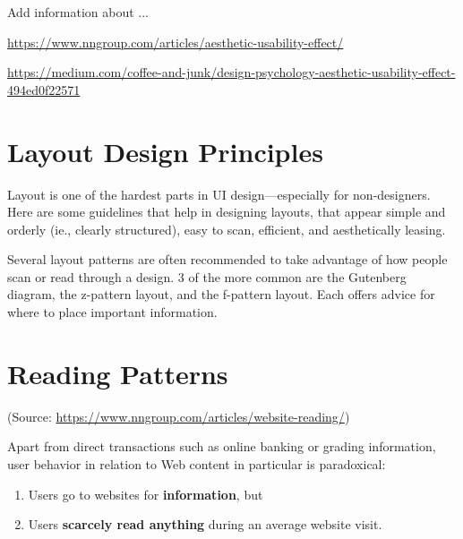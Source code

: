 \begin{tcolorbox}[
	width=\textwidth,
	title={\textbf{Excursus: What is the Aesthetic-Usability Effect?}},
	outer arc=0mm,
	arc=0mm,
	boxrule=1pt,
	]    
Add information about ...
\par \url{https://www.nngroup.com/articles/aesthetic-usability-effect/} 
\par \url{https://medium.com/coffee-and-junk/design-psychology-aesthetic-usability-effect-494ed0f22571}
\end{tcolorbox}

\label{sec:design_guidelines}

\section{Layout Design Principles} %
\label{sub:layout_design_principles}
Layout is one of the hardest parts in UI design---especially for non-designers.
Here are some guidelines that help in designing layouts, that appear simple and orderly (ie., clearly structured), easy to scan, efficient, and aesthetically leasing.

Several layout patterns are often recommended to take advantage of how people scan or read through a design. 3 of the more common are the Gutenberg diagram, the z-pattern layout, and the f-pattern layout. Each offers advice for where to place important information.



\section{Reading Patterns} %
\label{sub:reading_patterns}
(Source: \url{https://www.nngroup.com/articles/website-reading/})

Apart from direct transactions such as online banking or grading information, user behavior in relation to Web content in particular is paradoxical:
\begin{enumerate}
	\item Users go to websites for \textbf{information}, but
	\item Users \textbf{scarcely read anything} during an average website visit.
\end{enumerate}

